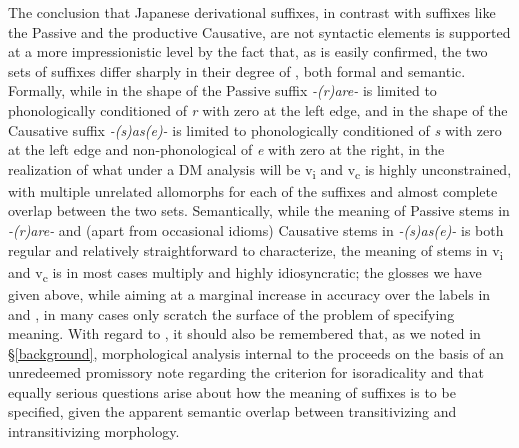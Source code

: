 \documentclass[output=paper,
modfonts
]{LSP/langsci}
\begin{document}
The conclusion that Japanese derivational suffixes, in contrast with
suffixes like the Passive and the productive Causative, are not
syntactic elements is supported at a more impressionistic level by the
fact that, as is easily confirmed, the two sets of suffixes differ
sharply in their degree of , both formal and semantic.
Formally, while  in the shape of the Passive suffix
\textit{-(r)are-} is limited to phonologically conditioned  of
\textit{r} with zero at the left edge, and  in the shape of the
Causative suffix \textit{-(s)as(e)-} is limited to phonologically
conditioned  of \textit{s} with zero at the left edge and
non-phonological  of \textit{e} with zero at the right,
 in the realization of what under a DM analysis will be
v\textsubscript{i} and v\textsubscript{c} is highly unconstrained, with
multiple unrelated allomorphs for each of the suffixes and almost
complete overlap between the two  sets. Semantically, while the
meaning of Passive stems in \textit{-(r)are-} and (apart from occasional
idioms) Causative stems in \textit{-(s)as(e)-} is both regular and
relatively straightforward to characterize, the meaning of stems in
v\textsubscript{i} and v\textsubscript{c} is in most cases multiply
 and highly idiosyncratic; the glosses we have given above,
while aiming at a marginal increase in accuracy over the labels in
\citet{jacobsen1992a} and \citet{volpe2005a}, in many cases only scratch the surface of
the problem of specifying  meaning. With regard to , it
should also be remembered that, as we noted in \S\ref{background}, morphological
analysis internal to the  proceeds on the basis of an unredeemed
promissory note regarding the criterion for isoradicality and that
equally serious questions arise about how the meaning of 
suffixes is to be specified, given the apparent semantic overlap between
transitivizing and intransitivizing morphology.
\end{document}
